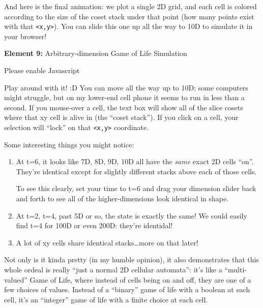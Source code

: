 \documentclass[]{article}
\begin{document}
And here is the final animation: we plot a single 2D grid, and each cell is
colored according to the size of the coset stack under that point (how many
points exist with that \texttt{\textless{}x,y\textgreater{}}). You can slide
this one up all the way to 10D to simulate it in your browser!

\leavevmode\hypertarget{golFlat}{}%
\textbf{Element 9:} Arbitrary-dimension Game of Life Simulation

\leavevmode\hypertarget{golFlatCont}{}%
Please enable Javascript

Play around with it! :D You can move all the way up to 10D; some computers might
struggle, but on my lower-end cell phone it seems to run in less than a second.
If you mouse-over a cell, the text box will show all of the slice cosets where
that xy cell is alive in (the ``coset stack''). If you click on a cell, your
selection will ``lock'' on that \texttt{\textless{}x,y\textgreater{}}
coordinate.

Some interesting things you might notice:

\begin{enumerate}
\def\labelenumi{\arabic{enumi}.}
\item
  At t=6, it looks like 7D, 8D, 9D, 10D all have the \emph{same} exact 2D cells
  ``on''. They're identical except for slightly different stacks above each of
  those cells.

  To see this clearly, set your time to t=6 and drag your dimension slider back
  and forth to see all of the higher-dimensions look identical in shape.
\item
  At t=2, t=4, past 5D or so, the state is exactly the same! We could easily
  find t=4 for 100D or even 200D: they're identidal!
\item
  A lot of xy cells share identical stacks\ldots more on that later!
\end{enumerate}

Not only is it kinda pretty (in my humble opinion), it also demonstrates that
this whole ordeal is really ``just a normal 2D cellular automata'': it's like a
``multi-valued'' Game of Life, where instead of cells being on and off, they are
one of a few choices of values. Instead of a ``binary'' game of life with a
boolean at each cell, it's an ``integer'' game of life with a finite choice at
each cell.
\end{document}
